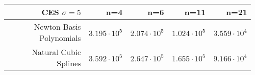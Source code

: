 \documentclass[]{article}
\begin{document}
\begin{longtable}[]{@{}rrrrr@{}}
\toprule
\begin{minipage}[b]{0.25\columnwidth}\raggedleft
CES \(\sigma = 5\)\strut
\end{minipage} & \begin{minipage}[b]{0.15\columnwidth}\raggedleft
n=4\strut
\end{minipage} & \begin{minipage}[b]{0.15\columnwidth}\raggedleft
n=6\strut
\end{minipage} & \begin{minipage}[b]{0.15\columnwidth}\raggedleft
n=11\strut
\end{minipage} & \begin{minipage}[b]{0.15\columnwidth}\raggedleft
n=21\strut
\end{minipage}\tabularnewline
\midrule
\endhead
\begin{minipage}[t]{0.25\columnwidth}\raggedleft
Newton Basis Polynomials\strut
\end{minipage} & \begin{minipage}[t]{0.15\columnwidth}\raggedleft
\(3.195 \cdot 10^{5}\)\strut
\end{minipage} & \begin{minipage}[t]{0.15\columnwidth}\raggedleft
\(2.074 \cdot 10^{5}\)\strut
\end{minipage} & \begin{minipage}[t]{0.15\columnwidth}\raggedleft
\(1.024 \cdot 10^{5}\)\strut
\end{minipage} & \begin{minipage}[t]{0.15\columnwidth}\raggedleft
\(3.559 \cdot 10^{4}\)\strut
\end{minipage}\tabularnewline
\begin{minipage}[t]{0.25\columnwidth}\raggedleft
Natural Cubic Splines\strut
\end{minipage} & \begin{minipage}[t]{0.15\columnwidth}\raggedleft
\(3.592 \cdot 10^{5}\)\strut
\end{minipage} & \begin{minipage}[t]{0.15\columnwidth}\raggedleft
\(2.647 \cdot 10^{5}\)\strut
\end{minipage} & \begin{minipage}[t]{0.15\columnwidth}\raggedleft
\(1.655 \cdot 10^{5}\)\strut
\end{minipage} & \begin{minipage}[t]{0.15\columnwidth}\raggedleft
\(9.166 \cdot 10^{4}\)\strut

\end{minipage}
\end{longtable}
\end{document}
